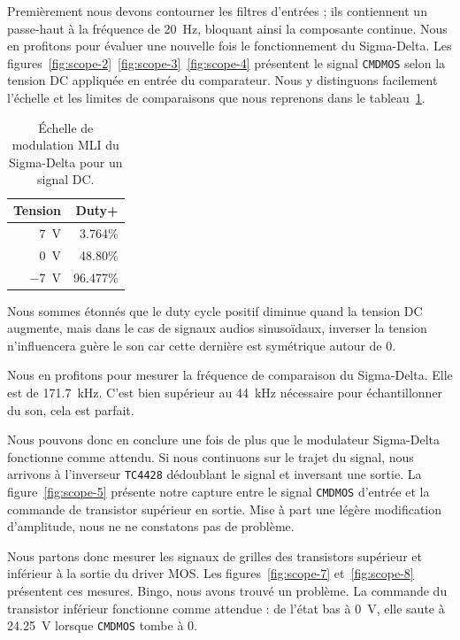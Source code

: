 \documentclass[10pt, oneside, a4paper]{article}
\begin{document}
Premièrement nous devons contourner les filtres d'entrées ; ils contiennent un passe-haut à la fréquence de \SI{20}{\hertz}, bloquant ainsi la composante continue.
Nous en profitons pour évaluer une nouvelle fois le fonctionnement du Sigma-Delta.
Les figures~\ref{fig:scope-2}~\ref{fig:scope-3}~\ref{fig:scope-4} présentent le signal \texttt{CMDMOS} selon la tension DC appliquée en entrée du comparateur.
Nous y distinguons facilement l'échelle et les limites de comparaisons que nous reprenons dans le tableau~\ref{tab:dutyCycleDC}.
\begin{table}[!ht]
	\centering
	\begin{tabular}{|r|r|}
	\hline
	Tension & Duty+ \\
	\hline
	\SI{7}{\volt}  & \num{3.764}\% \\
	\SI{0}{\volt}  & \num{48.80}\% \\
	\SI{-7}{\volt} & \num{96.477}\% \\
	\hline
	\end{tabular}
	\caption{Échelle de modulation MLI du Sigma-Delta pour un signal DC.}
	\label{tab:dutyCycleDC}
\end{table}
Nous sommes étonnés que le duty cycle positif diminue quand la tension DC augmente, mais dans le cas de signaux audios sinusoïdaux, inverser la tension n'influencera guère le son car cette dernière est symétrique autour de 0.

Nous en profitons pour mesurer la fréquence de comparaison du Sigma-Delta.
Elle est de \SI{171.7}{\kilo\hertz}.
C'est bien supérieur au \SI{44}{\kilo\hertz} nécessaire pour échantillonner du son, cela est parfait.

Nous pouvons donc en conclure une fois de plus que le modulateur Sigma-Delta fonctionne comme attendu.
Si nous continuons sur le trajet du signal, nous arrivons à l'inverseur \texttt{TC4428} dédoublant le signal et inversant une sortie.
La figure~\ref{fig:scope-5} présente notre capture entre le signal \texttt{CMDMOS} d'entrée et la commande de transistor supérieur en sortie.
Mise à part une légère modification d'amplitude, nous ne ne constatons pas de problème.

Nous partons donc mesurer les signaux de grilles des transistors supérieur et inférieur à la sortie du driver MOS.
Les figures~\ref{fig:scope-7} et~\ref{fig:scope-8} présentent ces mesures.
Bingo, nous avons trouvé un problème.
La commande du transistor inférieur fonctionne comme attendue : de l'état bas à \SI{0}{\volt}, elle saute à \SI{24.25}{\volt} lorsque \texttt{CMDMOS} tombe à 0.
\end{document}
